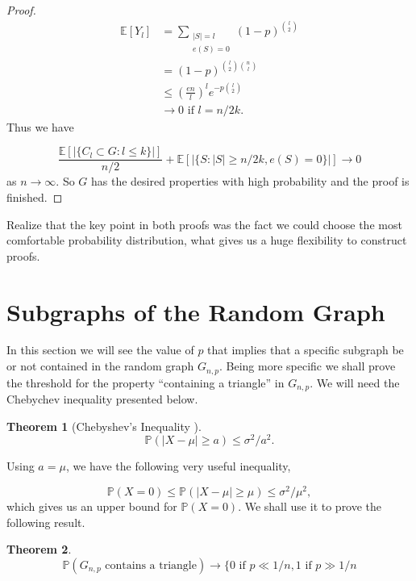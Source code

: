 \documentclass[12pt,twoside,a4paper]{book}
\numberwithin{equation}{section}
\newtheorem{theorem}             {Theorem}[section]
\theoremstyle{remark}
\begin{document}
\begin{proof}
\begin{align*}
\mathbb{E}[Y_l] &= \sum_{\substack{|S| = l \\ e(S) = 0 }} (1-p)^{\binom{l}{2}}\\
	       &= (1-p)^{\binom{l}{2} \binom{n}{l}} \\
	       &\leq \left(\frac{en}{l}\right)^l e^{-p\binom{l}{2}}\\
	       &\rightarrow 0  \text{ if } l = n/2k.
\end{align*}
Thus we have

$$\frac{\mathbb{E}[|\{C_l \subset G : l\leq k \}|]}{n/2} + \mathbb{E} [|\{ S:|S| \geq n/2k, e(S) = 0\}|] \rightarrow 0$$
as $n \rightarrow \infty $. So $G$ has the desired properties with high probability and the proof is finished.
\end{proof}

Realize that the key point in both proofs was the fact we could choose the most comfortable probability distribution, what gives us a huge flexibility to construct proofs.

\section{Subgraphs of the Random Graph}

In this section we will see the value of $p$ that implies that a specific subgraph be or not contained in the random graph $G_{n,p}$. Being more specific we shall prove the threshold for the property ``containing a triangle'' in $G_{n,p}$.  We will need the Chebychev inequality presented below.

\begin{theorem}[{Chebyshev's Inequality \cite{Ch67}}]
$$\mathbb{P}(|X-\mu| \geq a) \leq \sigma^2/a^2.$$
\end{theorem} 

Using $a = \mu$, we have the following very useful inequality,

$$\mathbb{P}(X=0) \leq \mathbb{P}(|X-\mu | \geq \mu) \leq \sigma^2/\mu^2,$$
which gives us an upper bound for $\mathbb{P}(X=0)$. We shall use it to prove the following result.\\

\begin{theorem}
$$ \mathbb{P}(G_{n,p}\text{ contains a triangle}) \rightarrow \big\{ 0 \text{ if } p \ll 1/n, 1 \text{ if } p \gg 1/n $$
\end{theorem}
\end{document}
